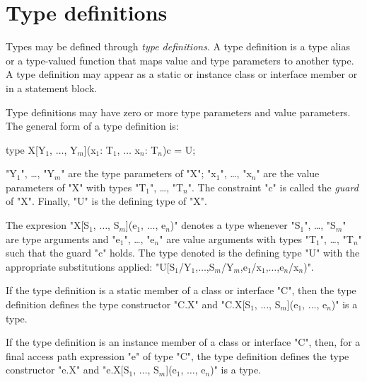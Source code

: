 

\section{Type definitions}
\label{TypeDefs}


        Types may be defined through {\em type definitions}.
        A type definition is a type alias or a type-valued function
        that maps value and type parameters to another type.
        A type definition may appear as a static or instance
        class or interface
        member or in a statement block.

        Type definitions may have zero or more type parameters
        and value parameters.
The general form of a type definition is:

\begin{xtenmath}
type X[Y$_1$, $\dots$, Y$_m$](x$_1$: T$_1$, $\dots$ x$_n$: T$_n$){c} = U;
\end{xtenmath}

\xcdmath"Y$_1$", \dots, \xcdmath"Y$_m$"
are the type parameters of \xcd"X";
\xcdmath"x$_1$", \dots, \xcdmath"x$_n$"
are the value parameters of \xcd"X" with types
\xcdmath"T$_1$", \dots, \xcdmath"T$_n$".
The constraint \xcd"c" is called the \emph{guard} of
\xcd"X".  Finally, \xcd"U" is the defining type of \xcd"X".
\label{TypeDefGuard}

The expresion \xcdmath"X[S$_1$, $\dots$, S$_m$](e$_1$, $\dots$, e$_n$)"
denotes a type whenever 
\xcdmath"S$_1$", \dots, \xcdmath"S$_m$" are type arguments and 
\xcdmath"e$_1$", \dots, \xcdmath"e$_n$" are value arguments with
types \xcdmath"T$_1$", \dots, \xcdmath"T$_n$"
such that the guard \xcd"c" holds. The type denoted is
the defining type \xcd"U" with the appropriate substitutions applied:
\xcdmath"U[S$_1$/Y$_1$,$\dots$,S$_m$/Y$_m$,e$_1$/x$_1$,$\dots$,e$_n$/x$_n$)".

        If the type definition 
        is a static member of a class or
        interface \xcd"C", then the type definition
        defines the type constructor \xcd"C.X"
and
\xcdmath"C.X[S$_1$, $\dots$, S$_m$](e$_1$, $\dots$, e$_n$)"
is a type.

        If the type definition 
        is an instance member of a class or
        interface \xcd"C", then, for a final access path expression \xcd"e" of type \xcd"C",
        the type definition
        defines the type constructor \xcd"e.X"
and
\xcdmath"e.X[S$_1$, $\dots$, S$_m$](e$_1$, $\dots$, e$_n$)"
is a type.


